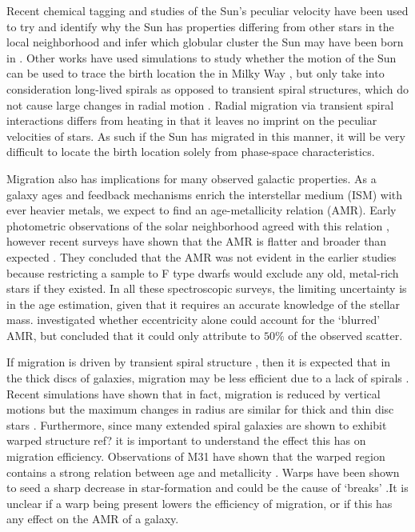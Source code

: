 \documentclass[usenatbib, useAMS,usegraphicx]{mn2e}
\newcommand{\red}{\color{red}}
\begin{document}
Recent chemical tagging and studies of the Sun's peculiar velocity have been used to try and identify why the Sun has properties differing from other stars in the local neighborhood and infer which globular cluster the Sun may have been born in \citep{Pichardo2012}. Other works have used simulations to study whether the motion of the Sun can be used to trace the birth location the in Milky Way \citep{Martinez-Barbosa2014}, but only take into consideration long-lived spirals as opposed to transient spiral structures, which do not cause large changes in radial motion \citep{sellwood2002}.  Radial migration via transient spiral interactions differs from heating in that it leaves no imprint on the peculiar velocities of stars. As such if the Sun has migrated in this manner, it will be very difficult to locate the birth location solely from phase-space characteristics.

Migration also has implications for many observed galactic properties. As a galaxy ages and feedback mechanisms enrich the interstellar medium (ISM) with ever heavier metals, we expect to find an age-metallicity relation (AMR). Early photometric observations of the solar neighborhood agreed with this relation \citep{twarog1980a}, however recent surveys have shown that the AMR is flatter and broader than expected \citep{Edvardsson1993a,Nordstrom2004,Haywood2008}. They concluded that the AMR was not evident in the earlier studies because restricting a sample to F type dwarfs would exclude any old, metal-rich stars if they existed. In all these spectroscopic surveys, the limiting uncertainty is in the age estimation, given that it requires an accurate knowledge of the stellar mass. \cite{Nordstrom2004} investigated whether eccentricity alone could account for the `blurred' AMR, but concluded that it could only attribute to $50\%$ of the observed scatter.

If migration is driven by transient spiral structure \citep{sellwood2002, roskar2008}, then it is expected that in the thick discs of galaxies, migration may be less efficient due to a lack of spirals \citep{elmegreen2011}. Recent simulations have shown that in fact, migration is reduced by vertical motions but the maximum changes in radius are similar for thick and thin disc stars \citep{Solway2012}. Furthermore, since many extended spiral galaxies are shown to exhibit warped structure {\red ref?} it is important to understand the effect this has on migration efficiency. Observations of M31 have shown that the warped region contains a strong relation between age and metallicity \citep{Bernard2012}. Warps have been shown to seed a sharp decrease in star-formation and could be the cause of `breaks' \citep{Sanchez-Blazquez2009}.It is unclear if a warp being present lowers the efficiency of migration, or if this has any effect on the AMR of a galaxy.
\end{document}
